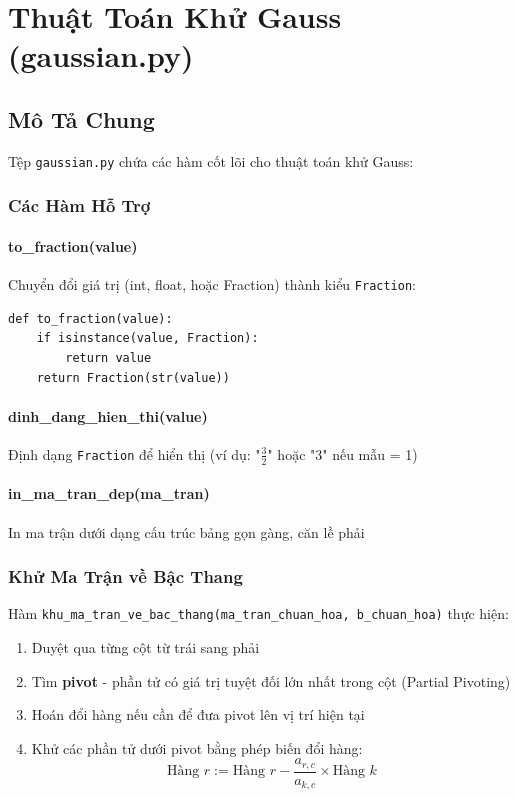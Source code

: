 \documentclass[12pt, a4paper, twoside]{article}
\begin{document}
\section{Thuật Toán Khử Gauss (gaussian.py)}

\subsection{Mô Tả Chung}

Tệp \texttt{gaussian.py} chứa các hàm cốt lõi cho thuật toán khử Gauss:

\subsubsection{Các Hàm Hỗ Trợ}

\paragraph{to\_fraction(value)}
Chuyển đổi giá trị (int, float, hoặc Fraction) thành kiểu \texttt{Fraction}:
\begin{lstlisting}
def to_fraction(value):
    if isinstance(value, Fraction):
        return value
    return Fraction(str(value))
\end{lstlisting}

\paragraph{dinh\_dang\_hien\_thi(value)}
Định dạng \texttt{Fraction} để hiển thị (ví dụ: "$\frac{3}{2}$" hoặc "3" nếu mẫu = 1)

\paragraph{in\_ma\_tran\_dep(ma\_tran)}
In ma trận dưới dạng cấu trúc bảng gọn gàng, căn lề phải

\subsubsection{Khử Ma Trận về Bậc Thang}

Hàm \texttt{khu\_ma\_tran\_ve\_bac\_thang(ma\_tran\_chuan\_hoa, b\_chuan\_hoa)} thực hiện:

\begin{enumerate}
    \item Duyệt qua từng cột từ trái sang phải
    \item Tìm \textbf{pivot} - phần tử có giá trị tuyệt đối lớn nhất trong cột (Partial Pivoting)
    \item Hoán đổi hàng nếu cần để đưa pivot lên vị trí hiện tại
    \item Khử các phần tử dưới pivot bằng phép biến đổi hàng:
    \[
    \text{Hàng } r := \text{Hàng } r - \frac{a_{r,c}}{a_{k,c}} \times \text{Hàng } k
    \]
\end{enumerate}
\end{document}
